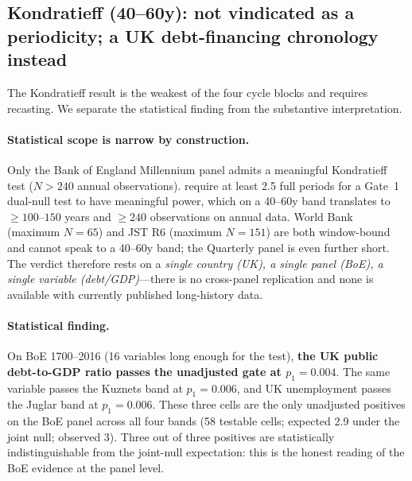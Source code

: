 \subsection{Kondratieff (40--60y): not vindicated as a periodicity; a UK
debt-financing chronology instead}
\label{sec:kondratieff_results}

The Kondratieff result is the weakest of the four cycle blocks
and requires recasting. We separate the statistical finding from
the substantive interpretation.

\paragraph{Statistical scope is narrow by construction.}
Only the Bank of England Millennium panel admits a meaningful
Kondratieff test (\(N>240\) annual observations).
\citet{torrence_compo1998} require at least 2.5 full periods for
a Gate~1 dual-null test to have meaningful power, which on a
40--60y band translates to \(\geq 100\)--\(150\) years and
\(\geq 240\) observations on annual data. World Bank
(maximum \(N=65\)) and JST R6 (maximum \(N=151\)) are both
window-bound and cannot speak to a 40--60y band; the Quarterly
panel is even further short. The verdict therefore rests on a
\emph{single country (UK), a single panel (BoE), a single
variable (debt/GDP)}---there is no cross-panel replication and
none is available with currently published long-history data.

\paragraph{Statistical finding.}
On BoE 1700--2016 (16 variables long enough for the test),
\textbf{the UK public debt-to-GDP ratio passes the unadjusted
gate at \(p_1=0.004\)}. The same variable passes the Kuznets
band at \(p_1=0.006\), and UK unemployment passes the Juglar
band at \(p_1=0.006\). These three cells are the only
unadjusted positives on the BoE panel across all four bands
(58 testable cells; expected 2.9 under the joint null;
observed 3). Three out of three positives are statistically
indistinguishable from the joint-null expectation: this is the
honest reading of the BoE evidence at the panel level.

